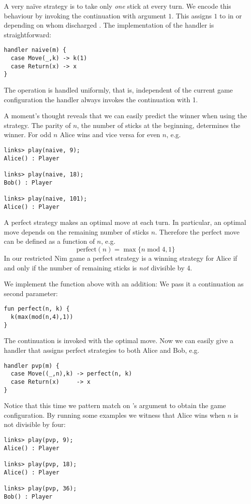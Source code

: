 \begin{example}\label{ex:nim-naive}
A very naïve strategy is to take only \emph{one} stick at every turn. We encode this behaviour by invoking the continuation with argument $1$. This assigns $1$ to  in  or  depending on whom discharged .
The implementation of the handler is straightforward:
\begin{lstlisting}[style=links]
handler naive(m) {
  case Move(_,k) -> k(1)
  case Return(x) -> x
}
\end{lstlisting}
The operation  is handled uniformly, that is, independent of the current game configuration the handler always invokes the continuation  with 1.

A moment's thought reveals that we can easily predict the winner when using the  strategy. The parity of $n$, the number of sticks at the beginning, determines the winner. For odd $n$ Alice wins and vice versa for even $n$, e.g.
\begin{lstlisting}[style=links]
links> play(naive, 9);
Alice() : Player

links> play(naive, 18);
Bob() : Player

links> play(naive, 101);
Alice() : Player
\end{lstlisting} 
\end{example}

\begin{example}\label{ex:nim-perfect}
A perfect strategy makes an optimal move at each turn. In particular, an optimal move depends on the remaining number of sticks $n$. Therefore the perfect move can be defined as a function of $n$, e.g.
\[ \text{perfect}(n) = \max\{n\; \text{mod}\; 4, 1\} \]
In our restricted Nim game a perfect strategy is a winning strategy for Alice if and only if the number of remaining sticks is \emph{not} divisible by 4.

We implement the function  above with an addition: We pass it a continuation as second parameter:
\begin{lstlisting}[style=links]
fun perfect(n, k) {
  k(max(mod(n,4),1))
}
\end{lstlisting}
The continuation is invoked with the optimal move. Now we can easily give a handler that assigns perfect strategies to both Alice and Bob, e.g.
\begin{lstlisting}[style=links]
handler pvp(m) {
  case Move((_,n),k) -> perfect(n, k)
  case Return(x)     -> x
}
\end{lstlisting}
Notice that this time we pattern match on 's argument to obtain the game configuration.
By running some examples we witness that Alice wins when $n$ is not divisible by four:
\begin{lstlisting}[style=links]
links> play(pvp, 9);
Alice() : Player

links> play(pvp, 18);
Alice() : Player

links> play(pvp, 36);
Bob() : Player
\end{lstlisting}
\end{example}

